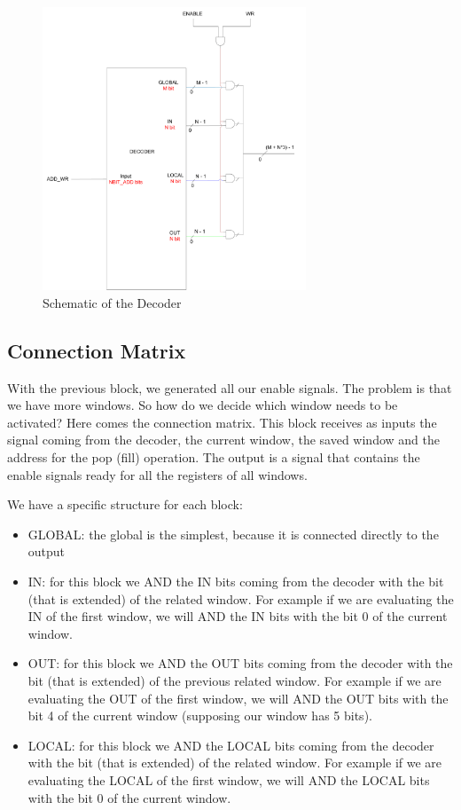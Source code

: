\begin{figure}[ht]
    \centering
    \includegraphics[width=0.7\textwidth]{chapters/4_DecodeStage/images/Decoder.pdf}
    \caption{Schematic of the Decoder}
    \label{decoder}
\end{figure}

\subsection{Connection Matrix}

With the previous block, we generated all our enable signals. The problem is that we have more windows. So how do we decide which window needs to be activated? Here comes the connection matrix. This block receives as inputs the signal coming from the decoder, the current window, the saved window and the address for the pop (fill) operation. The output is a signal that contains the enable signals ready for all the registers of all windows. 

We have a specific structure for each block:
\begin{itemize}
  \item GLOBAL: the global is the simplest, because it is connected directly to the output
  \item IN: for this block we AND the IN bits coming from the decoder with the bit (that is extended) of the related window. For example if we are evaluating the IN of the first window, we will AND the IN bits with the bit 0 of the current window.
  \item OUT: for this block we AND the OUT bits coming from the decoder with the bit (that is extended) of the previous related window. For example if we are evaluating the OUT of the first window, we will AND the OUT bits with the bit 4 of the current window (supposing our window has 5 bits).
  \item LOCAL: for this block we AND the LOCAL bits coming from the decoder with the bit (that is extended) of the related window. For example if we are evaluating the LOCAL of the first window, we will AND the LOCAL bits with the bit 0 of the current window.
\end{itemize}

